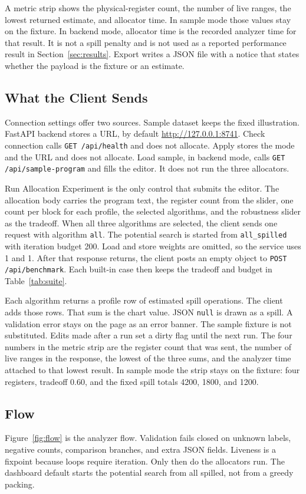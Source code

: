 \documentclass{ieeeaccess}
\begin{document}
A metric strip shows the physical-register count, the number of live ranges, the lowest returned estimate, and allocator time.
In sample mode those values stay on the fixture.
In backend mode, allocator time is the recorded analyzer time for that result.
It is not a spill penalty and is not used as a reported performance result in Section~\ref{sec:results}.
Export writes a JSON file with a notice that states whether the payload is the fixture or an estimate.

\subsection{What the Client Sends}
\label{sec:client}
Connection settings offer two sources.
Sample dataset keeps the fixed illustration.
FastAPI backend stores a URL, by default \url{http://127.0.0.1:8741}.
Check connection calls \texttt{GET /api/health} and does not allocate.
Apply stores the mode and the URL and does not allocate.
Load sample, in backend mode, calls \texttt{GET /api/sample-program} and fills the editor.
It does not run the three allocators.

Run Allocation Experiment is the only control that submits the editor.
The allocation body carries the program text, the register count from the slider, one count per block for each profile, the selected algorithms, and the robustness slider as the tradeoff.
When all three algorithms are selected, the client sends one request with algorithm \texttt{all}.
The potential search is started from \texttt{all\_spilled} with iteration budget 200.
Load and store weights are omitted, so the service uses 1 and 1.
After that response returns, the client posts an empty object to \texttt{POST /api/benchmark}.
Each built-in case then keeps the tradeoff and budget in Table~\ref{tab:suite}.

Each algorithm returns a profile row of estimated spill operations.
The client adds those rows.
That sum is the chart value.
JSON \texttt{null} is drawn as a spill.
A validation error stays on the page as an error banner.
The sample fixture is not substituted.
Edits made after a run set a dirty flag until the next run.
The four numbers in the metric strip are the register count that was sent, the number of live ranges in the response, the lowest of the three sums, and the analyzer time attached to that lowest result.
In sample mode the strip stays on the fixture: four registers, tradeoff 0.60, and the fixed spill totals 4200, 1800, and 1200.

\subsection{Flow}
\label{sec:flow}
Figure~\ref{fig:flow} is the analyzer flow.
Validation fails closed on unknown labels, negative counts, comparison branches, and extra JSON fields.
Liveness is a fixpoint because loops require iteration.
Only then do the allocators run.
The dashboard default starts the potential search from all spilled, not from a greedy packing.
\end{document}
